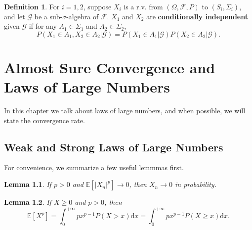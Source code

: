 \documentclass[openany]{book}
\newtheorem{lemma}{Lemma}[chapter]
\theoremstyle{definition}
\newtheorem{definition}{Definition}[chapter]
\theoremstyle{remark}
\begin{document}
\begin{definition}
    For $i=1,2$, suppose $X_i$ is a r.v. from $(\Omega, \mathcal{F},P)$ to $(S_i,\Sigma_i)$, and let $\mathcal{G}$ be a sub-$\sigma$-algebra of $\mathcal{F}$. $X_1$ and $X_2$ are \textbf{conditionally independent} given $\mathcal{G}$ if for any $A_1\in\Sigma_1$ and $A_2\in\Sigma_2$,
    \begin{equation*}
        P(X_1\in A_1,X_2\in A_2|\mathcal{G})=P(X_1\in A_1|\mathcal{G})P(X_2\in A_2|\mathcal{G}).
    \end{equation*}
\end{definition}

\chapter{Almost Sure Convergence and Laws of Large Numbers}\label{chp:LLN} %
In this chapter we talk about laws of large numbers, and when possible, we will state the convergence rate.

\section{Weak and Strong Laws of Large Numbers}
For convenience, we summarize a few useful lemmmas first.
\begin{lemma}
    If $p>0$ and $\mathbb{E}\left[|X_n|^p\right]\to0$, then $X_n\to0$ in probability.
\end{lemma}
\begin{lemma}\label{lem:momentFubini}
    If $X\ge0$ and $p>0$, then
    \begin{equation*}
        \mathbb{E}[X^p]=\int_0^{+\infty}px^{p-1}P(X>x)\mathrm{d}x=\int_0^{+\infty}px^{p-1}P(X\ge x)\mathrm{d}x.
    \end{equation*}
\end{lemma}
\end{document}
